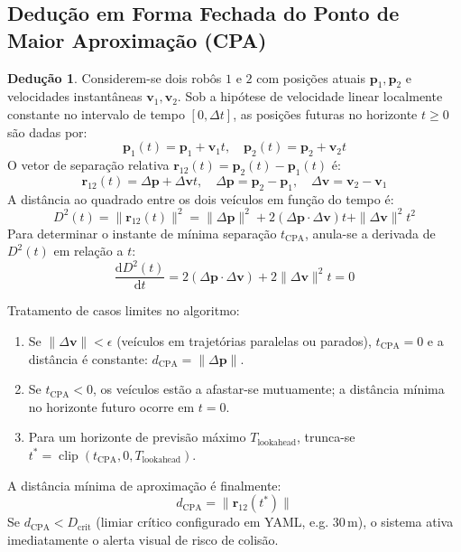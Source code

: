 \documentclass[11pt,a4paper]{article}
\newcommand{\vv}[1]{\mathbf{#1}}
\theoremstyle{definition}
\newtheorem{deducao}{Dedução}[section]
\newcommand{\caixaresultado}[1]{\begin{center}\fbox{\parbox{0.92\textwidth}{#1}}\end{center}}
\begin{document}
\subsection{Dedução em Forma Fechada do Ponto de Maior Aproximação (CPA)}
\begin{deducao}
Considerem-se dois robôs $1$ e $2$ com posições atuais $\vv{p}_1, \vv{p}_2$ e velocidades instantâneas $\vv{v}_1, \vv{v}_2$. Sob a hipótese de velocidade linear localmente constante no intervalo de tempo $[0, \Delta t]$, as posições futuras no horizonte $t \ge 0$ são dadas por:
\begin{equation}
    \vv{p}_1(t) = \vv{p}_1 + \vv{v}_1 t, \quad \vv{p}_2(t) = \vv{p}_2 + \vv{v}_2 t
\end{equation}
O vetor de separação relativa $\vv{r}_{12}(t) = \vv{p}_2(t) - \vv{p}_1(t)$ é:
\begin{equation}
    \vv{r}_{12}(t) = \Delta\vv{p} + \Delta\vv{v} t, \quad \Delta\vv{p} = \vv{p}_2 - \vv{p}_1, \quad \Delta\vv{v} = \vv{v}_2 - \vv{v}_1
\end{equation}
A distância ao quadrado entre os dois veículos em função do tempo é:
\begin{equation}
    D^2(t) = \|\vv{r}_{12}(t)\|^2 = \|\Delta\vv{p}\|^2 + 2 (\Delta\vv{p} \cdot \Delta\vv{v}) t + \|\Delta\vv{v}\|^2 t^2
\end{equation}
Para determinar o instante de mínima separação $t_{\text{CPA}}$, anula-se a derivada de $D^2(t)$ em relação a $t$:
\begin{equation}
    \frac{\mathrm{d} D^2(t)}{\mathrm{d} t} = 2 (\Delta\vv{p} \cdot \Delta\vv{v}) + 2 \|\Delta\vv{v}\|^2 t = 0
\end{equation}
\caixaresultado{
\begin{equation}
    t_{\text{CPA}} = -\frac{\Delta\vv{p} \cdot \Delta\vv{v}}{\|\Delta\vv{v}\|^2}
\end{equation}
}
Tratamento de casos limites no algoritmo:
\begin{enumerate}
    \item Se $\|\Delta\vv{v}\| < \epsilon$ (veículos em trajetórias paralelas ou parados), $t_{\text{CPA}} = 0$ e a distância é constante: $d_{\text{CPA}} = \|\Delta\vv{p}\|$.
    \item Se $t_{\text{CPA}} < 0$, os veículos estão a afastar-se mutuamente; a distância mínima no horizonte futuro ocorre em $t = 0$.
    \item Para um horizonte de previsão máximo $T_{\text{lookahead}}$, trunca-se $t^* = \operatorname{clip}(t_{\text{CPA}}, 0, T_{\text{lookahead}})$.
\end{enumerate}
A distância mínima de aproximação é finalmente:
\begin{equation}
    d_{\text{CPA}} = \|\vv{r}_{12}(t^*)\|
\end{equation}
Se $d_{\text{CPA}} < D_{\text{crit}}$ (limiar crítico configurado em YAML, e.g. $30\,\text{m}$), o sistema ativa imediatamente o alerta visual de risco de colisão.
\end{deducao}
\end{document}

